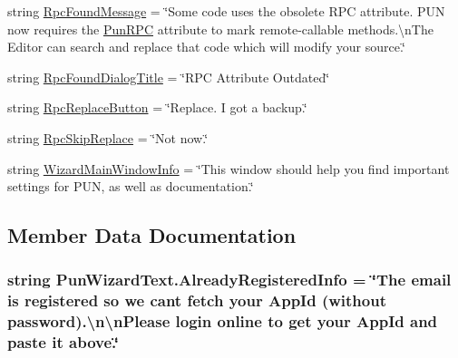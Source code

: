 \begin{DoxyCompactItemize}
\item 
string \hyperlink{class_pun_wizard_text_a08d2f13d94fb1fe3f7e82954fce4688d}{Rpc\+Found\+Message} = \char`\"{}Some code uses the obsolete R\+PC attribute. P\+UN now requires the \hyperlink{class_pun_r_p_c}{Pun\+R\+PC} attribute to mark remote-\/callable methods.\textbackslash{}n\+The Editor can search and replace that code which will modify your source.\char`\"{}
\item 
string \hyperlink{class_pun_wizard_text_aafdf8966fc6e4461a8a03c6bc0489aca}{Rpc\+Found\+Dialog\+Title} = \char`\"{}R\+PC Attribute Outdated\char`\"{}
\item 
string \hyperlink{class_pun_wizard_text_a7f737e36d4f8b456141eb1871df1dd52}{Rpc\+Replace\+Button} = \char`\"{}Replace. I got a backup.\char`\"{}
\item 
string \hyperlink{class_pun_wizard_text_a34ac77aec040899c39d68191c5a3084c}{Rpc\+Skip\+Replace} = \char`\"{}Not now.\char`\"{}
\item 
string \hyperlink{class_pun_wizard_text_ac25c43cc0f3bc50da2fc3ce8dec0ca56}{Wizard\+Main\+Window\+Info} = \char`\"{}This window should help you find important settings for P\+UN, as well as documentation.\char`\"{}
\end{DoxyCompactItemize}


\subsection{Member Data Documentation}
\subsubsection[{\texorpdfstring{Already\+Registered\+Info}{AlreadyRegisteredInfo}}]{\setlength{\rightskip}{0pt plus 5cm}string Pun\+Wizard\+Text.\+Already\+Registered\+Info = \char`\"{}The email is registered so we can\textquotesingle{}t fetch your App\+Id (without password).\textbackslash{}n\textbackslash{}n\+Please login online to get your App\+Id and paste it above.\char`\"{}}\hypertarget{class_pun_wizard_text_a996ee166945229246f0165013bdf8315}{}\label{class_pun_wizard_text_a996ee166945229246f0165013bdf8315}

